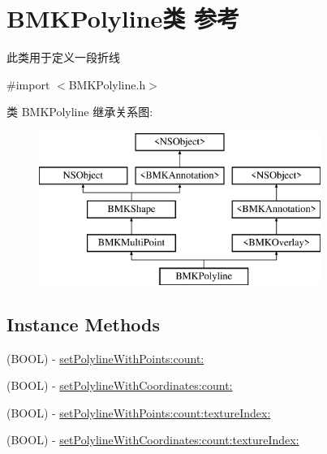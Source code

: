 \hypertarget{interface_b_m_k_polyline}{}\section{B\+M\+K\+Polyline类 参考}
\label{interface_b_m_k_polyline}


此类用于定义一段折线  




{\ttfamily \#import $<$B\+M\+K\+Polyline.\+h$>$}

类 B\+M\+K\+Polyline 继承关系图\+:\begin{figure}[H]
\begin{center}
\leavevmode
\includegraphics[height=5.000000cm]{interface_b_m_k_polyline}
\end{center}
\end{figure}
\subsection*{Instance Methods}
\begin{DoxyCompactItemize}
\item 
(B\+O\+O\+L) -\/ \hyperlink{interface_b_m_k_polyline_a4b85e49e3e543a33c82ba12baa0d42ff}{set\+Polyline\+With\+Points\+:count\+:}
\item 
(B\+O\+O\+L) -\/ \hyperlink{interface_b_m_k_polyline_a43a8dd5ac4d6a94c8357d333613431e6}{set\+Polyline\+With\+Coordinates\+:count\+:}
\item 
(B\+O\+O\+L) -\/ \hyperlink{interface_b_m_k_polyline_a4d1087d602695b877e6a358ba1d6c907}{set\+Polyline\+With\+Points\+:count\+:texture\+Index\+:}
\item 
(B\+O\+O\+L) -\/ \hyperlink{interface_b_m_k_polyline_a1ea5a063cb0ba05b0627a0139fa979a3}{set\+Polyline\+With\+Coordinates\+:count\+:texture\+Index\+:}
\end{DoxyCompactItemize}
